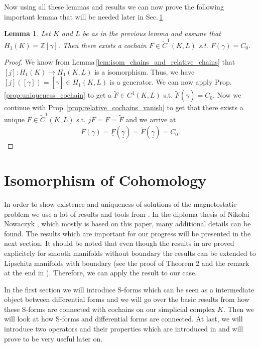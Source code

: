 \documentclass[12pt,a4paper]{article}
\numberwithin{equation}{subsection}
\newtheorem{lemma}{Lemma}[section]
\numberwithin{lemma}{subsection}
\theoremstyle{definition}
\newcommand{\integers}{\mathbb{Z}}
\begin{document}
Now using all these lemmas and results we can now prove the following
important lemma that will be needed later in Sec.\,\ref{}

\begin{lemma}
    Let $K$ and $L$ be as in the previous lemma and assume that 
    $H_1(K) = \integers [\gamma]$. Then there exists a cochain 
    $F \in \tilde{C}^1(K,L)$ s.t. $F(\gamma) = C_0$.
\end{lemma}
\begin{proof}
    We know from Lemma\,\ref{lem:isom_chains_and_relative_chains}
    that $[j]:H_1(K) \rightarrow H_1(K,L)$ is a isomorphism. Thus, we have
    $[j]([\gamma]) = [\underline{\gamma}] \in H_1(K,L)$ is a generator. 
    We can now apply Prop.\,\ref{prop:uniqueness_cochain} to get a 
    $\tilde{F} \in C^1(K,L)$ s.t. $\tilde{F}(\underline{\gamma}) = C_0$.
    Now we continue with Prop.\,\ref{prop:relative_cochains_vanish} to 
    get that there exists a unique $F \in \tilde{C}^1(K,L)$ s.t. 
    $jF = \underline{F} = \tilde{F}$ and we arrive at 
    \begin{align*}
        F(\gamma) = \underline{F}(\underline{\gamma}) 
        = \tilde{F}(\underline{\gamma}) = C_0.
    \end{align*}
\end{proof}



\section{Isomorphism of Cohomology}

In order to show existence and uniqueness of solutions of the magnetostatic 
problem we use a lot of results and tools from \cite{goldshtein}. 
In the diploma thesis of Nikolai
Nowaczyk \cite{nowaczyk}, which mostly is based on this paper, 
many additional details can be found. The results which are important for 
our progress will be presented in the
next section. It should be noted that even though the results in 
\cite{goldshtein} are
proved explicitely for smooth manifolds without boundary the results can be 
extended to Lipschitz manifolds with boundary (see the proof of Theorem 2 and 
the remark at the end in \cite{goldshtein}). Therefore, we can apply the result
to our case.

In the first section we will introduce S-forms which can be seen as a
intermediate object between differential forms and we will go over the 
basic results from \cite{goldshtein} how these S-forms are connected with 
cochains on our simplicial complex $K$. Then we will look at how S-forms 
and differential forms are connected. At last, we will introduce two  
operators and their properties which are introduced in \cite{goldshtein}
and will prove to be very useful later on.
\end{document}
